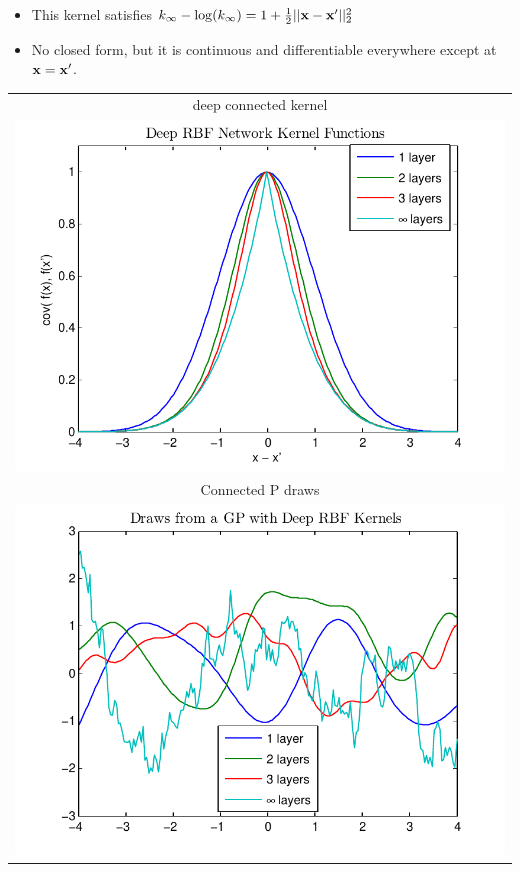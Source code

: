 \documentclass[portrait,a0b,final,a4resizeable]{include/a0poster}
\makeatletter
\newlength{\nonHumbleHeight}
\def\@humbleformat#1{{\settoheight{\nonHumbleHeight}{#1}\resizebox{!}{0.94\nonHumbleHeight}{#1}}}%
\def\humble#1{\@humbleformat{#1}}%
\newcommand{\gp}{{\humble GP}}
\makeatother
\begin{document}
\begin{poster}
\begin{multicols}{2}
\begin{minipage}[c]{0.6\columnwidth}
\begin{itemize}
\item This kernel satisfies $k_\infty - \log(k_\infty) = 1 + \frac{1}{2} || {\bf{x}} - {\bf{x}}' ||_2^2$
\item No closed form, but it is continuous and differentiable everywhere except at ${\bf{x}} = {\bf{x}}'$.
\end{itemize}
\end{minipage}
\begin{minipage}[c]{0.39\columnwidth}
\begin{centering}
\begin{tabular}{c}
deep connected kernel \\
\hspace{-0.5cm}\includegraphics[width=\columnwidth, clip, trim = 0cm 0cm 1cm 0.61cm]{../figures/deep_kernel_connected} \\
Connected \gp{} draws \\
\hspace{-0.5cm}\includegraphics[width=\columnwidth, clip, trim = 0cm 0cm 1cm 0.61cm]{../figures/deep_kernel_connected_draws}

\end{tabular}
\end{centering}
\end{minipage}
\end{multicols}
\end{poster}
\end{document}
